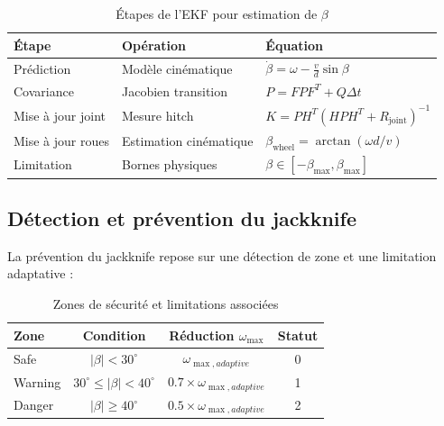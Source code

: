 \documentclass[a4paper,12pt]{report}
\begin{document}
\begin{table}[htbp]
    \centering
    \begin{tabular}{p{3cm}p{4cm}p{4cm}}
        \toprule
        \textbf{Étape} & \textbf{Opération} & \textbf{Équation} \\
        \midrule
        Prédiction & Modèle cinématique & $\dot{\beta} = \omega - \frac{v}{d}\sin\beta$ \\
        Covariance & Jacobien transition & $P = F P F^T + Q \Delta t$ \\
        Mise à jour joint & Mesure hitch & $K = P H^T (H P H^T + R_{\text{joint}})^{-1}$ \\
        Mise à jour roues & Estimation cinématique & $\beta_{\text{wheel}} = \arctan(\omega d / v)$ \\
        Limitation & Bornes physiques & $\beta \in [-\beta_{\max}, \beta_{\max}]$ \\
        \bottomrule
    \end{tabular}
    \caption{Étapes de l'EKF pour estimation de $\beta$}
    \label{tab:ekf_beta}
\end{table}

\subsection{Détection et prévention du jackknife}
\label{subsec:anti_jackknife}

La prévention du jackknife repose sur une détection de zone et une limitation adaptative :

\begin{table}[htbp]
    \centering
    \begin{tabular}{lccc}
        \toprule
        \textbf{Zone} & \textbf{Condition} & \textbf{Réduction $\omega_{\max}$} & \textbf{Statut} \\
        \midrule
        Safe & $|\beta| < 30^\circ$ & $\omega_{\max,adaptive}$ & 0 \\
        Warning & $30^\circ \leq |\beta| < 40^\circ$ & $0.7 \times \omega_{\max,adaptive}$ & 1 \\
        Danger & $|\beta| \geq 40^\circ$ & $0.5 \times \omega_{\max,adaptive}$ & 2 \\
        \bottomrule
    \end{tabular}
    \caption{Zones de sécurité et limitations associées}
    \label{tab:zones_jackknife}
\end{table}
\end{document}

